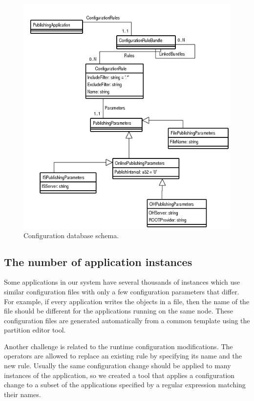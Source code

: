 \begin{figure}[ht]
\centering
\includegraphics[scale=0.75]{Images/oks_schema.png}
\caption{Configuration database schema.}
\label{fig:oks_schema}
\end{figure}

\subsection*{The number of application instances}

Some applications in our system have several thousands of instances which use similar configuration files with only a few configuration parameters that differ. For example, if every application writes the objects in a file, then the name of the file should be different for the applications running on the same node. These configuration files are generated automatically from a common template using the partition editor tool.

Another challenge is related to the runtime configuration modifications. The operators are allowed to replace an existing rule by specifying its name and the new rule. Usually the same configuration change should be applied to many instances of the application, so we created a tool that applies a configuration change to a subset of the applications specified by a regular expression matching their names.

